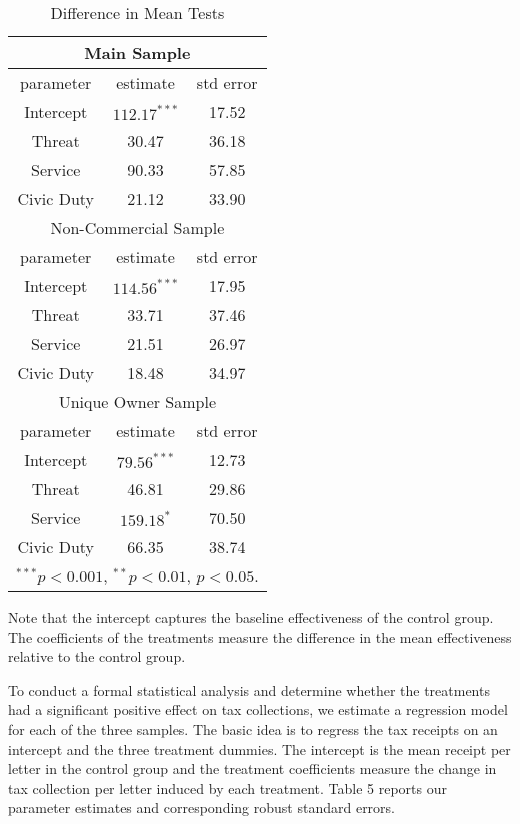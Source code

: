 \documentclass[12pt,titlepage]{article}
\begin{document}
\begin{table}[htbp]
\caption{Difference in Mean Tests}\label{dif_mean}
\begin{center}
\begin{tabular}{|c|c|c|}
\hline
\multicolumn{3}{|c|}{Main Sample} \\
\hline
parameter & estimate & std error \\
\hline
Intercept&  $112.17^{***}$ & 17.52 \\
Threat & 30.47  & 36.18 \\
Service & 90.33 & 57.85 \\ 
Civic Duty& 21.12 & 33.90 \\
\hline
\multicolumn{3}{|c|}{Non-Commercial Sample} \\
\hline
parameter & estimate & std error \\
\hline
Intercept & $114.56^{***}$ & 17.95 \\
Threat & 33.71 &  37.46 \\
Service & 21.51 &  26.97 \\
Civic Duty & 18.48 & 34.97 \\
\hline
\multicolumn{3}{|c|}{Unique Owner Sample} \\
\hline
parameter & estimate & std error \\
\hline
Intercept &  $79.56^{***}$ &  12.73  \\
Threat & 46.81 &  29.86 \\ 
Service & $159.18^{*}$ & 70.50 \\ 
Civic  Duty & 66.35 &  38.74 \\
\hline
\multicolumn{3}{|l|}{$^{***}p<0.001$, $^{**}p<0.01$,  $p<0.05$.} \\

\hline
\end{tabular}
\end{center}
Note that the intercept captures the baseline effectiveness of the control group. The coefficients of the treatments measure the difference in the mean effectiveness relative to the control group.
\end{table}

To conduct a formal statistical analysis and determine whether the treatments 
had a significant positive effect on tax collections, we estimate a regression model 
for each of the three samples. The basic idea is to  regress the tax receipts on an intercept 
and the three treatment dummies. The intercept is the mean receipt per letter in the control group and the 
treatment coefficients measure the change in tax collection per letter induced by each treatment.
Table 5 reports our parameter estimates and corresponding robust standard errors.
\end{document}
